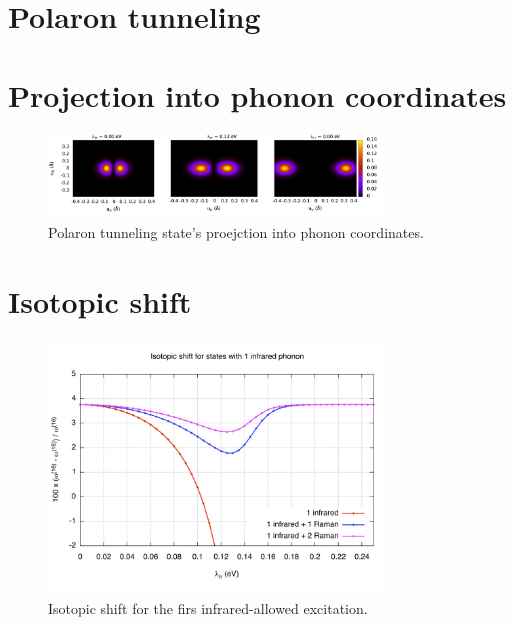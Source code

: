 
\section{Polaron tunneling}

\section{Projection into phonon coordinates}

\begin{figure}[ht!]
\centering
\includegraphics[width=0.8\textwidth]{images/ph-first_infrared.png}
\caption{Polaron tunneling state's proejction into phonon coordinates.}
\label{fig:ph-first_infrared}
\end{figure}

\section{Isotopic shift}
\label{sec:polaron-isotopic-shift}

\begin{figure}[ht!]
\centering
\includegraphics[width=0.8\textwidth]{images/isot-1ir.jpg}
\caption{Isotopic shift for the firs infrared-allowed excitation.}
\label{fig:isot-1ir}
\end{figure}

